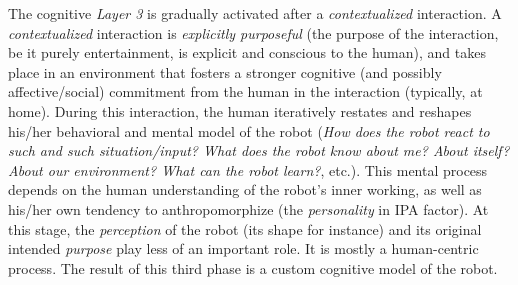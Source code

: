 \documentclass{frontiersSCNS} %
\begin{document}
The cognitive \emph{Layer 3} is gradually activated after a
\emph{contextualized} interaction.  A \emph{contextualized} interaction is
\emph{explicitly purposeful} (the purpose of the interaction, be it purely
entertainment, is explicit and conscious to the human), and takes place in an
environment that fosters a stronger cognitive (and possibly affective/social)
commitment from the human in the interaction (typically, at home). During this
interaction, the human iteratively restates and reshapes his/her behavioral and
mental model of the robot (\emph{How does the robot react to such and such
situation/input?  What does the robot know about me? About itself? About our
environment? What can the robot learn?}, etc.).
This mental process depends on the human understanding of the robot's inner
working, as well as his/her own tendency to anthropomorphize (the
\emph{personality} in IPA factor). At this stage, the \emph{perception} of the
robot (its shape for instance) and its original intended \emph{purpose} play
less of an important role. It is mostly a human-centric process.  The result of
this third phase is a custom cognitive model of the robot.
\end{document}
